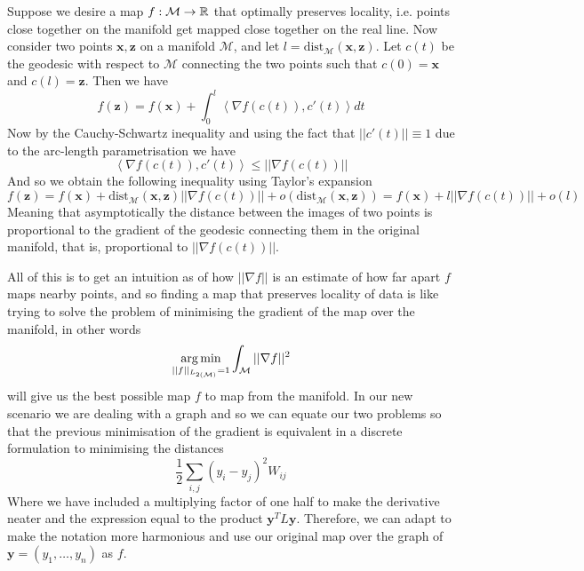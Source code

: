 \documentclass[12pt]{article}
\begin{document}
Suppose we desire a map $f:\mathcal{M} \to \mathbb{R}$ that optimally preserves locality, i.e. points close together on the manifold get mapped close together on the real line. Now consider two points $\mathbf{x},\mathbf{z}$ on a  manifold $\mathcal{M}$, and let $l=\text{dist}_{\mathcal{M}}(\mathbf{x},\mathbf{z})$. Let $c(t)$ be the geodesic with respect to $\mathcal{M}$ connecting the two points such that $c(0)=\mathbf{x}$ and $c(l)=\mathbf{z}$. Then we have
\begin{equation*}
    f(\mathbf{z}) = f(\mathbf{x}) + \int_{0}^{l}{\left<\nabla f(c(t)), c'(t)\right>dt}
\end{equation*}
Now by the Cauchy-Schwartz inequality and using the fact that $||c'(t)||\equiv1$ due to the arc-length parametrisation we have
\begin{equation*}
    \left<\nabla f(c(t)), c'(t)\right> \le ||\nabla f(c(t))||
\end{equation*}
And so we obtain the following inequality using Taylor's expansion
\begin{equation*}
    f(\mathbf{z}) = f(\mathbf{x}) + \text{dist}_{\mathcal{M}}(\mathbf{x},\mathbf{z})||\nabla f(c(t))|| + o(\text{dist}_{\mathcal{M}}(\mathbf{x},\mathbf{z})) = f(\mathbf{x}) + l||\nabla f(c(t))|| + o(l)
\end{equation*}
Meaning that asymptotically the distance between the images of two points is proportional to the gradient of the geodesic connecting them in the original manifold, that is, proportional to $||\nabla f(c(t))||$.\par All of this is to get an intuition as of how $||\nabla f||$ is an estimate of how far apart $f$ maps nearby points, and so finding a map that preserves locality of data is like trying to solve the problem of minimising the gradient of the map over the manifold, in other words
\begin{equation}\label{min}
    \operatorname*{arg\,min}_{||f||_{L_{2(\mathcal{M})}}=1}{\int_{\mathcal{M}}{||\nabla f||^2}}
\end{equation}
will give us the best possible map $f$ to map from the manifold. In our new scenario we are dealing with a graph and so we can equate our two problems so that the previous minimisation of the gradient is equivalent in a discrete formulation to minimising the distances
\begin{equation*}
    \frac{1}{2}\sum_{i,j}{(y_i-y_j)^2W_{ij}}
\end{equation*}
Where we have included a multiplying factor of one half to make the derivative neater and the expression equal to the product $\mathbf{y}^TL\mathbf{y}$. Therefore, we can adapt to make the notation more harmonious and use our original map over the graph of $\mathbf{y} = (y_1,\dots, y_n)$ as $f$.
    
\end{document}
